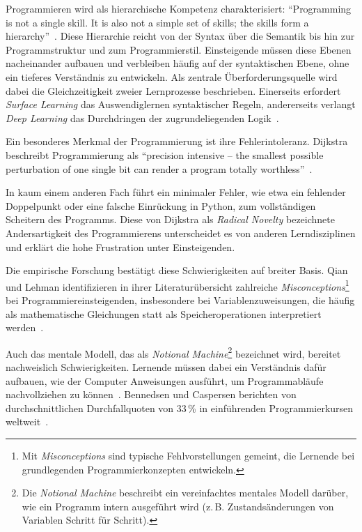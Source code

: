 Programmieren wird als hierarchische Kompetenz charakterisiert: \enquote{Programming is not a single skill. It is also not a simple set of skills; the skills form a hierarchy}~\cite{jenkins2002}. Diese Hierarchie reicht von der Syntax über die Semantik bis hin zur Programmstruktur und zum Programmierstil. Einsteigende müssen diese Ebenen nacheinander aufbauen und verbleiben häufig auf der syntaktischen Ebene, ohne ein tieferes Verständnis zu entwickeln. Als zentrale Überforderungsquelle wird dabei die Gleichzeitigkeit zweier Lernprozesse beschrieben. Einerseits erfordert \textit{Surface Learning} das Auswendiglernen syntaktischer Regeln, andererseits verlangt \textit{Deep Learning} das Durchdringen der zugrundeliegenden Logik~\cite{jenkins2002}.

Ein besonderes Merkmal der Programmierung ist ihre Fehlerintoleranz. Dijkstra beschreibt Programmierung als \enquote{precision intensive -- the smallest possible perturbation of one single bit can render a program totally worthless}~\cite{jenkins2002}.

In kaum einem anderen Fach führt ein minimaler Fehler, wie etwa ein fehlender Doppelpunkt oder eine falsche Einrückung in Python, zum vollständigen Scheitern des Programms. Diese von Dijkstra als \textit{Radical Novelty} bezeichnete Andersartigkeit des Programmierens unterscheidet es von anderen Lerndisziplinen und erklärt die hohe Frustration unter Einsteigenden.


Die empirische Forschung bestätigt diese Schwierigkeiten auf breiter Basis. Qian und Lehman identifizieren in ihrer Literaturübersicht zahlreiche \textit{Misconceptions}\footnote{Mit \textit{Misconceptions} sind typische Fehlvorstellungen gemeint, die Lernende bei grundlegenden Programmierkonzepten entwickeln.} bei Programmiereinsteigenden, insbesondere bei Variablenzuweisungen, die häufig als mathematische Gleichungen statt als Speicheroperationen interpretiert werden~\cite{qian2017}. 

Auch das mentale Modell, das als \textit{Notional Machine}\footnote{Die \textit{Notional Machine} beschreibt ein vereinfachtes mentales Modell darüber, wie ein Programm intern ausgeführt wird (z.\,B. Zustandsänderungen von Variablen Schritt für Schritt).} bezeichnet wird, bereitet nachweislich Schwierigkeiten. 
Lernende müssen dabei ein Verständnis dafür aufbauen, wie der Computer Anweisungen ausführt, um Programmabläufe nachvollziehen zu können~\cite{sorva2013}. Bennedsen und Caspersen berichten von durchschnittlichen Durchfallquoten von 33\,\% in einführenden Programmierkursen weltweit~\cite{bennedsen2007}.

